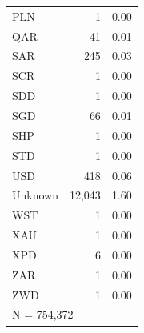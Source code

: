 \begin{tabular}{lrr}
PLN                 &           1&        0.00\\
QAR                 &          41&        0.01\\
SAR                 &         245&        0.03\\
SCR                 &           1&        0.00\\
SDD                 &           1&        0.00\\
SGD                 &          66&        0.01\\
SHP                 &           1&        0.00\\
STD                 &           1&        0.00\\
USD                 &         418&        0.06\\
Unknown             &      12,043&        1.60\\
WST                 &           1&        0.00\\
XAU                 &           1&        0.00\\
XPD                 &           6&        0.00\\
ZAR                 &           1&        0.00\\
ZWD                 &           1&        0.00\\
\midrule


\multicolumn{3}{l}{\footnotesize N =      754,372}\\


\bottomrule


\end{tabular}



